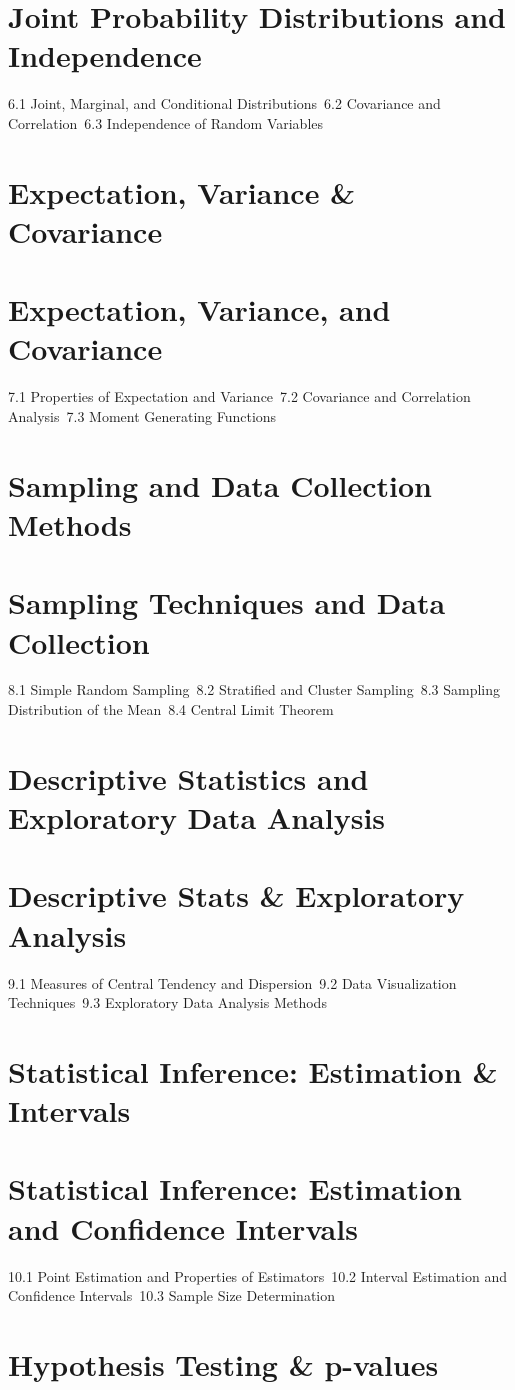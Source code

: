 \section{Joint Probability Distributions and Independence}
6.1 Joint, Marginal, and Conditional Distributions\
6.2 Covariance and Correlation\
6.3 Independence of Random Variables\
\section{Expectation, Variance \& Covariance}
\section{Expectation, Variance, and Covariance}
7.1 Properties of Expectation and Variance\
7.2 Covariance and Correlation Analysis\
7.3 Moment Generating Functions\
\section{Sampling and Data Collection Methods}
\section{Sampling Techniques and Data Collection}
8.1 Simple Random Sampling\
8.2 Stratified and Cluster Sampling\
8.3 Sampling Distribution of the Mean\
8.4 Central Limit Theorem\
\section{Descriptive Statistics and Exploratory Data Analysis}
\section{Descriptive Stats \& Exploratory Analysis}
9.1 Measures of Central Tendency and Dispersion\
9.2 Data Visualization Techniques\
9.3 Exploratory Data Analysis Methods\
\section{Statistical Inference: Estimation \& Intervals}
\section{Statistical Inference: Estimation and Confidence Intervals}
10.1 Point Estimation and Properties of Estimators\
10.2 Interval Estimation and Confidence Intervals\
10.3 Sample Size Determination\
\section{Hypothesis Testing \& p-values}
